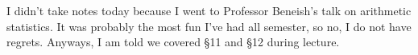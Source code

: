 














I didn't take notes today because I went to Professor Beneish's talk on arithmetic statistics. It was probably the most fun I've had all semester, so no, I do not have regrets. Anyways, I am told we covered \S11 and \S12 during lecture.